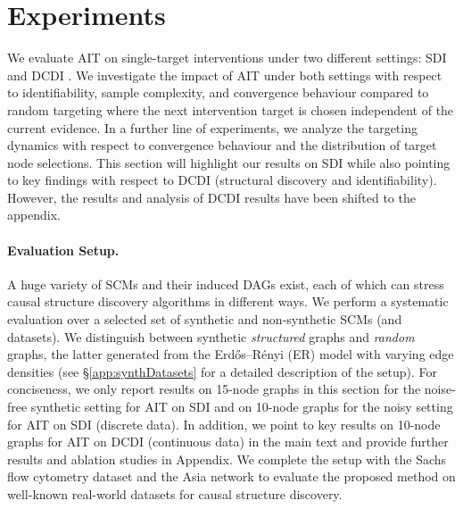 \documentclass[nohyperref]{article}
\theoremstyle{plain}
\theoremstyle{definition}
\theoremstyle{remark}
\begin{document}
\vspace{-2mm}
\section{Experiments}
\vspace{-1mm}
We evaluate AIT on single-target interventions under two different settings: SDI \citep{ke2019learning} and DCDI \citep{brouillard2020differentiable}. We investigate the impact of AIT under both settings with respect to identifiability, sample complexity, and convergence behaviour compared to random targeting  where the next intervention target is chosen independent of the current  evidence. In a further line of experiments, we analyze the targeting dynamics with respect to convergence behaviour and the distribution of target node selections. %
This section will highlight our results on SDI while also pointing to key findings with respect to DCDI (structural discovery and identifiability). However, the results and analysis of DCDI results have been shifted to the appendix.

\vspace{-2mm}
\paragraph{Evaluation Setup.} A huge variety of SCMs and their induced DAGs exist, each of which can stress causal structure discovery algorithms in different ways. We perform a systematic evaluation over a selected set of synthetic and non-synthetic SCMs (and datasets). We distinguish between synthetic \textit{structured} graphs and \textit{random} graphs, the latter generated from the Erdős–Rényi (ER) model with varying edge densities (see \S\ref{app:synthDatasets} for a detailed description of the setup). For conciseness, we only report results on 15-node graphs in this section for the noise-free synthetic setting for AIT on SDI and on 10-node graphs for the noisy setting for AIT on SDI (discrete data). In addition, we point to key results on 10-node graphs for AIT on DCDI (continuous data) in the main text and provide further results and ablation studies in Appendix. We complete the setup with the Sachs flow cytometry dataset \citep{sachs2005causal} and the Asia network  \citep{lauritzen1988local} to evaluate the proposed method on well-known real-world datasets for causal structure discovery. 

\vspace{-1mm}
\end{document}
